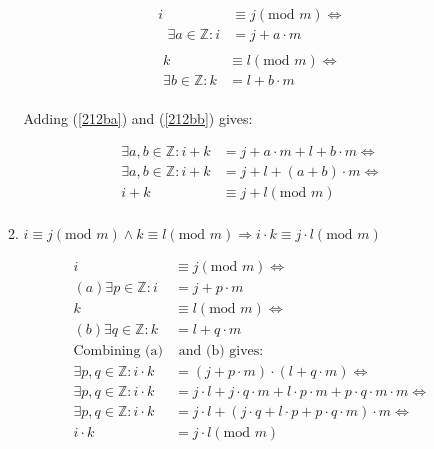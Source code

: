 \documentclass[10pt,\jkfside,a4paper]{article}
\begin{document}
\begin{enumerate}
\begin{enumerate}
\begin{equation}\label{212ba}
\begin{split}
i &\equiv j (\text{mod } m) \Longleftrightarrow\\
\text{ } \exists a \in \mathbb{Z}: i &= j + a\cdot m \\
\end{split}
\end{equation}
\begin{equation}\label{212bb}
\begin{split}
k &\equiv l (\text{mod } m) \Longleftrightarrow\\
\exists b \in \mathbb{Z}: k &= l + b\cdot m\\
\end{split}
\end{equation}
\begin{center}
Adding (\ref{212ba}) and (\ref{212bb}) gives:
\end{center}
\begin{equation}\label{212bc}
\begin{split}
\exists a, b \in \mathbb{Z}: i + k &= j + a\cdot m + l + b\cdot m \Longleftrightarrow\\
\exists a, b \in \mathbb{Z}: i + k &= j + l + (a + b)\cdot m \Longleftrightarrow\\
i + k &\equiv j + l (\text{mod } m)\\
\end{split}
\end{equation}

\item $i \equiv j (\text{mod } m) \wedge k \equiv l (\text{mod } m) \Longrightarrow i \cdot k \equiv j\cdot l (\text{mod } m)$

\begin{equation}\label{2a}
\begin{split}
i &\equiv j (\text{mod } m) \Longleftrightarrow\\
(a) \exists p \in \mathbb{Z}: i &= j + p \cdot m\\
k &\equiv l(\text{mod } m) \Longleftrightarrow\\
(b) \exists q \in \mathbb{Z}: k &= l + q \cdot m\\
\text{Combining (a)}&\text{ and (b) gives:}\\
\exists p, q \in \mathbb{Z}: i \cdot k &= (j + p\cdot m)\cdot(l + q\cdot m) \Longleftrightarrow\\
\exists p, q \in \mathbb{Z}: i \cdot k &= j \cdot l + j \cdot q \cdot m + l\cdot p \cdot m + p \cdot q \cdot m \cdot m \Longleftrightarrow\\
\exists p, q \in \mathbb{Z}: i \cdot k &= j\cdot l + (j\cdot q + l\cdot p + p\cdot q \cdot m) \cdot m \Longleftrightarrow\\
i\cdot k &= j\cdot l (\text{mod } m)\\
\end{split}
\end{equation}


\end{enumerate}
\end{enumerate}
\end{document}
